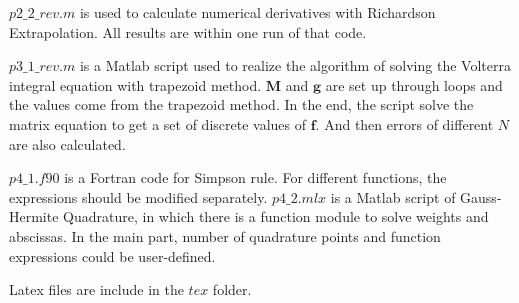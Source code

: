 \documentclass[letterpaper,10pt]{article}
\begin{document}
$p2\_2\_{rev}.m$ is used to calculate numerical derivatives with Richardson Extrapolation. All results are within one run of that code. 

$p3\_1\_{rev}.m$ is a Matlab script used to realize the algorithm of solving the Volterra integral equation with trapezoid method. 
$\bm{M}$ and $\bm{g}$ are set up through loops and the values come from the trapezoid method. In the end, the script 
solve the matrix equation to get a set of discrete values of $\bm{f}$. And then errors of different 
$N$ are also calculated. 

$p4\_1.f90$ is a Fortran code for Simpson rule. For different functions, the expressions should be modified separately. 
$p4\_2.mlx$ is a Matlab script of Gauss-Hermite Quadrature, in which there is a function module to solve weights and abscissas. 
In the main part, number of quadrature points and function expressions could be user-defined. 

Latex files are include in the $tex$ folder. 
\end{document}
